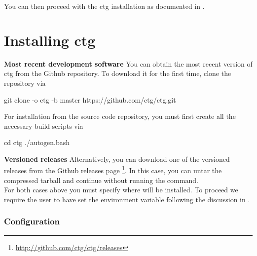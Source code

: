 You can then proceed with the ctg installation as documented in .

\section{Installing ctg}
\label{sec:inst:ctg}

\textbf{Most recent development software}\quad
You can obtain the most recent version of ctg from the Github repository.
To download it for the first time, clone the repository via
%
\begin{commandline}
git clone -o ctg -b master https://github.com/ctg/ctg.git
\end{commandline}

For installation from the source code repository, you must first create all the necessary build scripts via
%
\begin{commandline}
cd ctg
./autogen.bash
\end{commandline}
%

\textbf{Versioned releases}\quad
Alternatively, you can download one of the versioned releases from the Github releases page
\footnote{\url{http://github.com/ctg/ctg/releases}}. In this case, you can
untar the compressed tarball and continue without running the 
command.\\

For both cases above you must specify where \ctg will be installed. To proceed we
require the user to have set the  environment variable following
the discussion in .

\subsubsection{Configuration}


